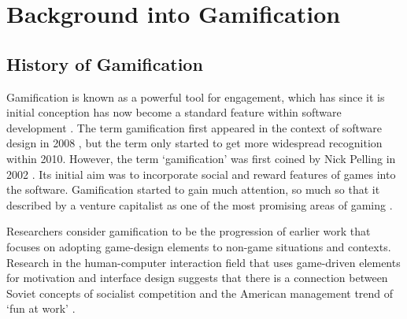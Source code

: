 \chapter{Background into Gamification}
	\label{chap:resources}
		

	\section{History of Gamification}
		
		Gamification is known as a powerful tool for engagement, which has since it is initial conception has now become a standard feature within software development \cite{history}. The term gamification first appeared in the context of software design in 2008 \cite{walz15}, but the term only started to get more widespread recognition within 2010. However, the term ‘gamification’ was first coined by Nick Pelling in 2002 \cite{history}. Its initial aim was to incorporate social and reward features of games into the software. Gamification started to gain much attention, so much so that it described by a venture capitalist as one of the most promising areas of gaming \cite{wikigame}.
		
		Researchers consider gamification to be the progression of earlier work that focuses on adopting game-design elements to non-game situations and contexts. Research in the human-computer interaction field that uses game-driven elements for motivation and interface design suggests that there is a connection between Soviet concepts of socialist competition and the American management trend of ‘fun at work’ \cite{wikigame}.
		
